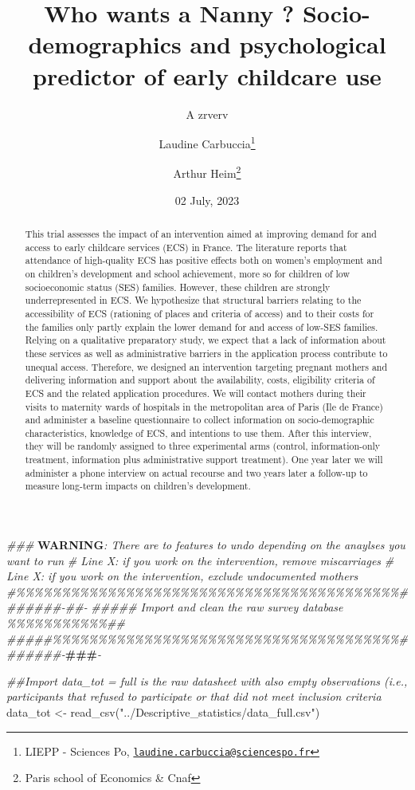 \documentclass[
]{article}
\title{Who wants a Nanny ? Socio-demographics and psychological
predictor of early childcare use}
\subtitle{A zrverv}
\author{Laudine Carbuccia\footnote{LIEPP - Sciences Po,
  \href{mailto:laudine.carbuccia@sciencespo.fr}{\nolinkurl{laudine.carbuccia@sciencespo.fr}}} \and Arthur
Heim\footnote{Paris school of Economics \& Cnaf}}
\date{02 July, 2023}
\newenvironment{Shaded}{}{}
\newcommand{\AlertTok}[1]{\textcolor[rgb]{1.00,0.00,0.00}{\textbf{#1}}}
\newcommand{\CommentTok}[1]{\textcolor[rgb]{0.38,0.63,0.69}{\textit{#1}}}
\newcommand{\DocumentationTok}[1]{\textcolor[rgb]{0.73,0.13,0.13}{\textit{#1}}}
\newcommand{\FunctionTok}[1]{\textcolor[rgb]{0.02,0.16,0.49}{#1}}
\newcommand{\NormalTok}[1]{#1}
\newcommand{\OtherTok}[1]{\textcolor[rgb]{0.00,0.44,0.13}{#1}}
\newcommand{\StringTok}[1]{\textcolor[rgb]{0.25,0.44,0.63}{#1}}
\begin{document}
\maketitle
\begin{abstract}
This trial assesses the impact of an intervention aimed at improving
demand for and access to early childcare services (ECS) in France. The
literature reports that attendance of high-quality ECS has positive
effects both on women's employment and on children's development and
school achievement, more so for children of low socioeconomic status
(SES) families. However, these children are strongly underrepresented in
ECS. We hypothesize that structural barriers relating to the
accessibility of ECS (rationing of places and criteria of access) and to
their costs for the families only partly explain the lower demand for
and access of low-SES families. Relying on a qualitative preparatory
study, we expect that a lack of information about these services as well
as administrative barriers in the application process contribute to
unequal access. Therefore, we designed an intervention targeting
pregnant mothers and delivering information and support about the
availability, costs, eligibility criteria of ECS and the related
application procedures. We will contact mothers during their visits to
maternity wards of hospitals in the metropolitan area of Paris (Ile de
France) and administer a baseline questionnaire to collect information
on socio-demographic characteristics, knowledge of ECS, and intentions
to use them. After this interview, they will be randomly assigned to
three experimental arms (control, information-only treatment,
information plus administrative support treatment). One year later we
will administer a phone interview on actual recourse and two years later
a follow-up to measure long-term impacts on children's development.
\end{abstract}

\begin{Shaded}
\begin{Highlighting}[]
\DocumentationTok{\#\#\# }\AlertTok{WARNING}\DocumentationTok{: There are to features to undo depending on the anaylses you want to run }
\CommentTok{\# Line X: if you work on the intervention, remove miscarriages}
\CommentTok{\# Line X: if you work on the intervention, exclude undocumented mothers}
\CommentTok{\#\%\%\%\%\%\%\%\%\%\%\%\%\%\%\%\%\%\%\%\%\%\%\%\%\%\%\%\%\%\%\%\%\%\%\%\%\%\%\%\%\%\%\#\#\#\#\#\#\#{-}\#\#{-}}
\DocumentationTok{\#\#\#\#\# Import and clean the raw survey database \%\%\%\%\%\%\%\%\%\%\%\#\#}
\DocumentationTok{\#\#\#\#\#\%\%\%\%\%\%\%\%\%\%\%\%\%\%\%\%\%\%\%\%\%\%\%\%\%\%\%\%\%\%\%\%\%\%\%\%\%\%\#\#\#\#\#\#\#{-}}\AlertTok{\#\#\#}\DocumentationTok{{-}}

\DocumentationTok{\#\#Import data\_tot = full is the raw datasheet with also empty observations (i.e., participants that refused to participate or that did not meet inclusion criteria}
\NormalTok{data\_tot }\OtherTok{\textless{}{-}} \FunctionTok{read\_csv}\NormalTok{(}\StringTok{"../Descriptive\_statistics/data\_full.csv"}\NormalTok{)}
\end{Highlighting}
\end{Shaded}
\end{document}
